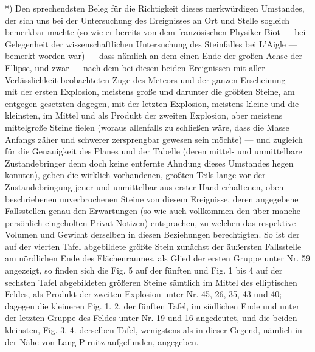 \documentclass[a4paper, 11pt, oneside, german]{article}
\begin{document}
*) Den sprechendsten Beleg für die Richtigkeit dieses merkwürdigen Umstandes, der sich uns bei der Untersuchung des Ereignisses an Ort und Stelle sogleich bemerkbar machte (so wie er bereits von dem französischen Physiker Biot --- bei Gelegenheit der wissenschaftlichen Untersuchung des Steinfalles bei L'Aigle --- bemerkt worden war) --- dass nämlich an dem einen Ende der großen Achse der Ellipse, und zwar --- nach dem bei diesen beiden Ereignissen mit aller Verlässlichkeit beobachteten Zuge des Meteors und der ganzen Erscheinung --- mit der ersten Explosion, meistens große und darunter die größten Steine, am entgegen gesetzten dagegen, mit der letzten Explosion, meistens kleine und die kleinsten, im Mittel und als Produkt der zweiten Explosion, aber meistens mittelgroße Steine fielen (woraus allenfalls zu schließen wäre, dass die Masse Anfangs zäher und schwerer zersprengbar gewesen sein möchte) --- und zugleich für die Genauigkeit des Planes und der Tabelle (deren mittel- und unmittelbare Zustandebringer denn doch keine entfernte Ahndung dieses Umstandes hegen konnten), geben die wirklich vorhandenen, größten Teils lange vor der Zustandebringung jener und unmittelbar aus erster Hand erhaltenen, oben beschriebenen unverbrochenen Steine von diesem Ereignisse, deren angegebene Fallsstellen genau den Erwartungen (so wie auch vollkommen den über manche persönlich eingeholten Privat-Notizen) entsprachen, zu welchen das respektive Volumen und Gewicht derselben in diesen Beziehungen berechtigten. So ist der auf der vierten Tafel abgebildete größte Stein zunächst der äußersten Fallsstelle am nördlichen Ende des Flächenraumes, als Glied der ersten Gruppe unter Nr. 59 angezeigt, so finden sich die Fig. 5 auf der fünften und Fig. 1 bis 4 auf der sechsten Tafel abgebildeten größeren Steine sämtlich im Mittel des elliptischen Feldes, als Produkt der zweiten Explosion unter Nr. 45, 26, 35, 43 und 40; dagegen die kleineren Fig. 1. 2. der fünften Tafel, im südlichen Ende und unter der letzten Gruppe des Feldes unter Nr. 19 und 16 angedeutet, und die beiden kleinsten, Fig. 3. 4. derselben Tafel, wenigstens als in dieser Gegend, nämlich in der Nähe von Lang-Pirnitz aufgefunden, angegeben.
\end{document}
